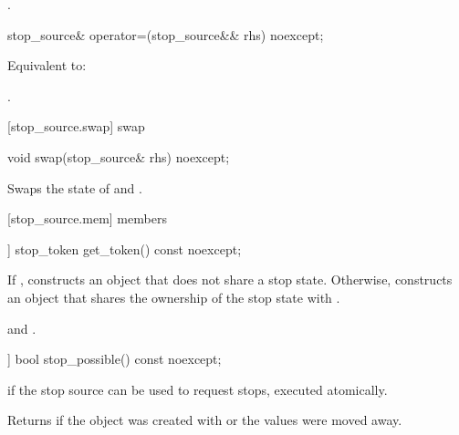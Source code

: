 {\begin{itemdescr}
  \pnum\returns {}.
\end{itemdescr}

%
\begin{itemdecl}
stop_source& operator=(stop_source&& rhs) noexcept;
\end{itemdecl}
\begin{itemdescr}
  \pnum\effects Equivalent to: 

  \pnum\returns {}.
\end{itemdescr}

[stop_source.swap]{ swap}

%
\begin{itemdecl}
void swap(stop_source& rhs) noexcept;
\end{itemdecl}

\begin{itemdescr}
 \pnum \effects Swaps the state of  and .
\end{itemdescr}


[stop_source.mem]{ members}

%
\begin{itemdecl}
[[nodiscard]] stop_token get_token() const noexcept;
\end{itemdecl}
\begin{itemdescr}
  \pnum\effects If , constructs an  object
                that does not share a stop state.
                Otherwise, constructs an  object 
                that shares the ownership of the stop state with .

  \pnum\postconditions {}
                and .
\end{itemdescr}


%
\begin{itemdecl}
[[nodiscard]] bool stop_possible() const noexcept;
\end{itemdecl}
\begin{itemdescr}
  \pnum\returns {} if the stop source can be used to request stops, executed atomically.
                \begin{note} Returns  if the object was created with 
                             or the values were moved away.
                             \end{note}
\end{itemdescr}

}
